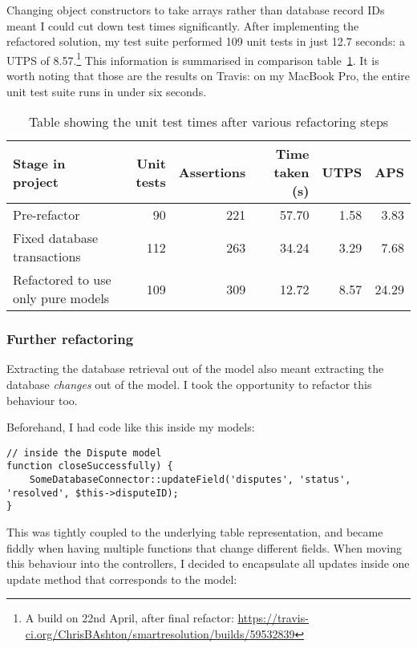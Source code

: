 Changing object constructors to take arrays rather than database record IDs meant I could cut down test times significantly. After implementing the refactored solution, my test suite performed 109 unit tests in just 12.7 seconds: a UTPS of 8.57.\footnote{A build on 22nd April, after final refactor: \url{https://travis-ci.org/ChrisBAshton/smartresolution/builds/59532839}} This information is summarised in comparison table~\ref{table:testTimes}. It is worth noting that those are the results on Travis: on my MacBook Pro, the entire unit test suite runs in under six seconds.

\begin{table}[h!]
\label{table:testTimes}
\begin{center}
\begin{tabular}{ l | r | r | r | r | r}
  Stage in project & Unit tests & Assertions & Time taken (s) & UTPS & APS \\
  \hline
  Pre-refactor & 90 & 221 & 57.70 & 1.58 & 3.83\\
  Fixed database transactions & 112 & 263 & 34.24 & 3.29 & 7.68\\
  Refactored to use only pure models & 109 & 309 & 12.72 & 8.57 & 24.29
\end{tabular}
\end{center}
\caption {Table showing the unit test times after various refactoring steps}
\end{table}

\subsubsection{Further refactoring}

Extracting the database retrieval out of the model also meant extracting the database \emph{changes} out of the model. I took the opportunity to refactor this behaviour too.

Beforehand, I had code like this inside my models:

\begin{lstlisting}
// inside the Dispute model
function closeSuccessfully) {
    SomeDatabaseConnector::updateField('disputes', 'status', 'resolved', $this->disputeID);
}
\end{lstlisting}

This was tightly coupled to the underlying table representation, and became fiddly when having multiple functions that change different fields. When moving this behaviour into the controllers, I decided to encapsulate all updates inside one update method that corresponds to the model:

